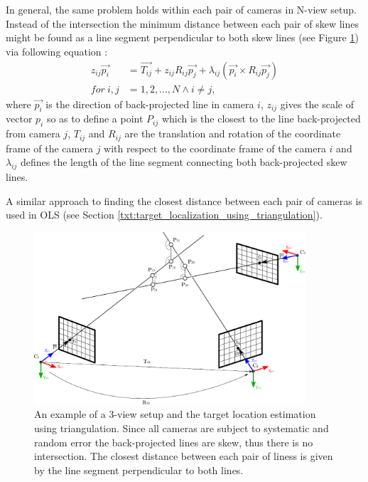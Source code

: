 In general, the same problem holds within each pair of cameras in N-view setup. Instead of the intersection the minimum distance between each pair of skew lines might be found as a line segment perpendicular to both skew lines (see Figure \ref{fig:multi_view_intersection}) via following equation \cite{Forsyth:2002:CVM:580035}:
\begin{align}
	z_{ij}\vec{p_{i}} &= \vec{T_{ij}} + z_{ij}R_{ij}\vec{p_{j}} + \lambda_{ij}(\vec{p_{i}} \times R_{ij}\vec{p_{j}})\\
	for~i,j           &= 1,2,...,N \land i \neq j,
\end{align}
where $\vec{p_{i}}$ is the direction of back-projected line in camera $i$, $z_{ij}$ gives the scale of vector ${p_{i}}$ so as to define a point $P_{ij}$ which is the closest to the line back-projected from camera $j$, $T_{ij}$ and $R_{ij}$ are the translation and rotation of the coordinate frame of the camera $j$ with respect to the coordinate frame of the camera $i$ and $\lambda_{ij}$ defines the length of the line segment connecting both back-projected skew lines.

A similar approach to finding the closest distance between each pair of cameras is used in OLS (see Section \ref{txt:target_localization_using_triangulation}).

\begin{figure}[tbh]
	\centering
	\includegraphics[width=0.9\textwidth]{fig/multi_view_intersection.pdf}
	\caption{An example of a 3-view setup and the target location estimation using triangulation. Since all cameras are subject to systematic and random error the back-projected lines are skew, thus there is no intersection. The closest distance between each pair of liness is given by the line segment perpendicular to both lines.}
	\label{fig:multi_view_intersection}
\end{figure}

